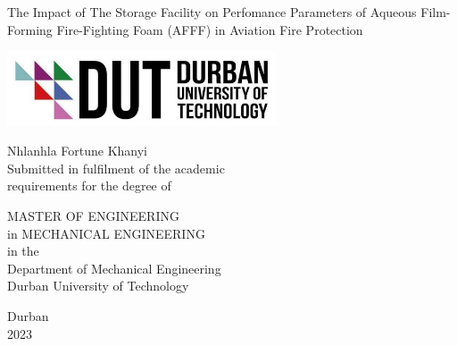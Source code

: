 \begin{titlepage}
\begin{center}

\doublespacing
\vspace*{1cm}

\large
The Impact of The Storage Facility on Perfomance Parameters of Aqueous Film-Forming Fire-Fighting Foam (AFFF) in Aviation Fire Protection

\vspace{2cm}

\includegraphics[width=0.6\textwidth]{images/logo.png}

\Large
Nhlanhla Fortune Khanyi \\

\large
Submitted in fulfilment of the academic\\
requirements for the degree of

\vspace{1.5cm}

MASTER OF ENGINEERING \\
in MECHANICAL ENGINEERING \\
in the \\

Department of Mechanical Engineering \\
Durban University of Technology

\vspace{1cm}

\normalsize
Durban \\
2023

\end{center}
\end{titlepage}